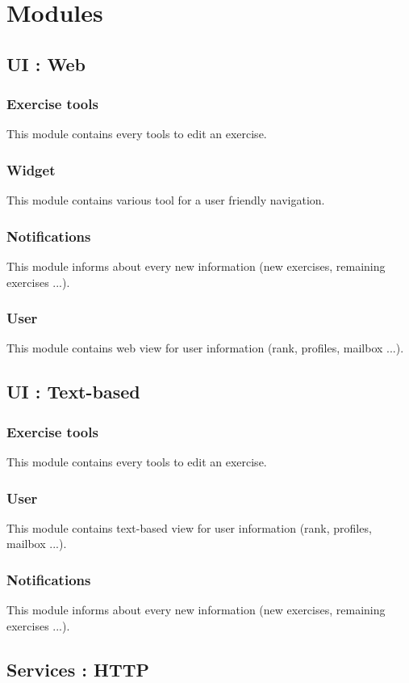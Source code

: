 \chapter{Modules}

\section{UI : Web}
	\subsection{Exercise tools}
		This module contains every tools to edit an exercise.
	\subsection{Widget}
		This module contains various tool for a user friendly navigation.
	\subsection{Notifications}
		This module informs about every new information (new exercises, remaining exercises ...).
	\subsection{User}
		This module contains web view for user information (rank, profiles, mailbox ...).

\section{UI : Text-based}
	\subsection{Exercise tools}
		This module contains every tools to edit an exercise.	
	\subsection{User}
		This module contains text-based view for user information (rank, profiles, mailbox ...).
	\subsection{Notifications}
		This module informs about every new information (new exercises, remaining exercises ...).
		
\section{Services : HTTP}
